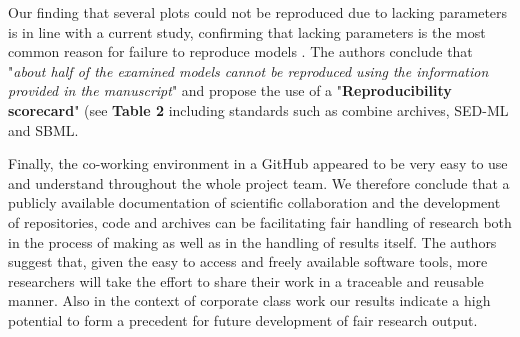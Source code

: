 Our finding that several plots could not be reproduced due to lacking parameters is in line with a current study, confirming that lacking parameters is the most common reason for failure to reproduce models \cite{tiwari2021reproducibility}. The authors conclude that "\textit{about half of the examined models cannot be reproduced using the information provided in the manuscript}" \cite{tiwari2021reproducibility} and propose the use of a "\textbf{Reproducibility scorecard}" (see \textbf{Table 2} including standards such as \ac{combine} archives, SED-ML and SBML.

Finally, the co-working environment in a GitHub appeared to be very easy to use and understand throughout the whole project team. We therefore conclude that a publicly available documentation of scientific collaboration and the development of repositories, code and archives can be facilitating \ac{fair} handling of research both in the process of making as well as in the handling of results itself.
The authors suggest that, given the easy to access and freely available software tools, more researchers will take the effort to share their work in a traceable and reusable manner. Also in the context of corporate class work our results indicate a high potential to form a precedent for future development of \ac{fair} research output.

\pagebreak

